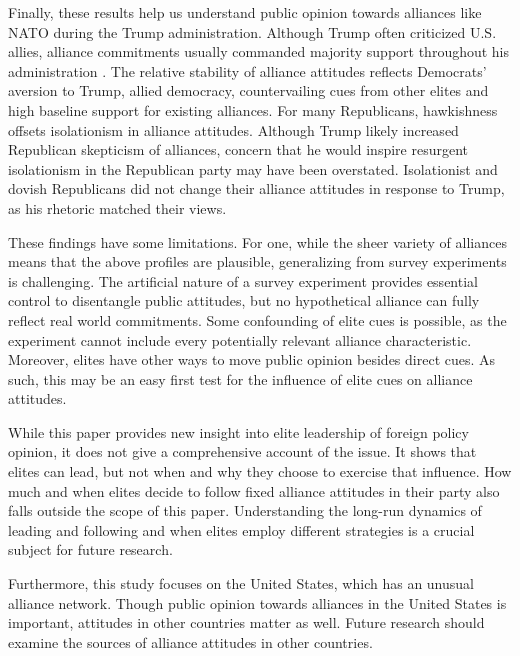 \documentclass[12pt]{article}
\begin{document}
Finally, these results help us understand public opinion towards alliances like NATO during the Trump administration.
Although Trump often criticized U.S. allies, alliance commitments usually commanded majority support throughout his administration \citep{PewNATO2020}. 
The relative stability of alliance attitudes reflects Democrats' aversion to Trump, allied democracy, countervailing cues from other elites and high baseline support for existing alliances. 
For many Republicans, hawkishness offsets isolationism in alliance attitudes.
Although Trump likely increased Republican skepticism of alliances, concern that he would inspire resurgent isolationism in the Republican party may have been overstated.
Isolationist and dovish Republicans did not change their alliance attitudes in response to Trump, as his rhetoric matched their views. 


These findings have some limitations. 
For one, while the sheer variety of alliances means that the above profiles are plausible, generalizing from survey experiments is challenging. 
The artificial nature of a survey experiment provides essential control to disentangle public attitudes, but no hypothetical alliance can fully reflect real world commitments.
Some confounding of elite cues is possible, as the experiment cannot include every potentially relevant alliance characteristic. 
Moreover, elites have other ways to move public opinion besides direct cues.
As such, this may be an easy first test for the influence of elite cues on alliance attitudes. 


While this paper provides new insight into elite leadership of foreign policy opinion, it does not give a comprehensive account of the issue.
It shows that elites can lead, but not when and why they choose to exercise that influence. 
How much and when elites decide to follow fixed alliance attitudes in their party also falls outside the scope of this paper. 
Understanding the long-run dynamics of leading and following and when elites employ different strategies is a crucial subject for future research. 


Furthermore, this study focuses on the United States, which has an unusual alliance network. 
Though public opinion towards alliances in the United States is important, attitudes in other countries matter as well. 
Future research should examine the sources of alliance attitudes in other countries. 
\end{document}
